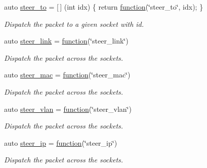 \begin{DoxyCompactItemize}
auto \hyperlink{namespacepfq_1_1lang_1_1anonymous__namespace_02default_8hpp_03_a4980fea0af16a26df90f252b5ae21113}{steer\+\_\+to} = \mbox{[}$\,$\mbox{]} (int idx) \{ return \hyperlink{namespacepfq_1_1lang_a1a4638059d700ae08d0ca63886ff2bb3}{function}(\char`\"{}steer\+\_\+to\char`\"{}, idx); \}
\begin{DoxyCompactList}\small\item\em Dispatch the packet to a given socket with id. \end{DoxyCompactList}\item 
auto \hyperlink{namespacepfq_1_1lang_1_1anonymous__namespace_02default_8hpp_03_ac1f3f9a2caf886a1441e62860a4ca058}{steer\+\_\+link} = \hyperlink{namespacepfq_1_1lang_a1a4638059d700ae08d0ca63886ff2bb3}{function}(\char`\"{}steer\+\_\+link\char`\"{})
\begin{DoxyCompactList}\small\item\em Dispatch the packet across the sockets. \end{DoxyCompactList}\item 
auto \hyperlink{namespacepfq_1_1lang_1_1anonymous__namespace_02default_8hpp_03_ad51e91e3b485c729ac1ba39a46e337a0}{steer\+\_\+mac} = \hyperlink{namespacepfq_1_1lang_a1a4638059d700ae08d0ca63886ff2bb3}{function}(\char`\"{}steer\+\_\+mac\char`\"{})
\begin{DoxyCompactList}\small\item\em Dispatch the packet across the sockets. \end{DoxyCompactList}\item 
auto \hyperlink{namespacepfq_1_1lang_1_1anonymous__namespace_02default_8hpp_03_a2c6a8ad5a3ae8b60a6a3d18a510f22ac}{steer\+\_\+vlan} = \hyperlink{namespacepfq_1_1lang_a1a4638059d700ae08d0ca63886ff2bb3}{function}(\char`\"{}steer\+\_\+vlan\char`\"{})
\begin{DoxyCompactList}\small\item\em Dispatch the packet across the sockets. \end{DoxyCompactList}\item 
auto \hyperlink{namespacepfq_1_1lang_1_1anonymous__namespace_02default_8hpp_03_afe1c69c555a75021f7e637086cb1264c}{steer\+\_\+ip} = \hyperlink{namespacepfq_1_1lang_a1a4638059d700ae08d0ca63886ff2bb3}{function}(\char`\"{}steer\+\_\+ip\char`\"{})
\begin{DoxyCompactList}\small\item\em Dispatch the packet across the sockets. \end{DoxyCompactList}\item 

\end{DoxyCompactItemize}
